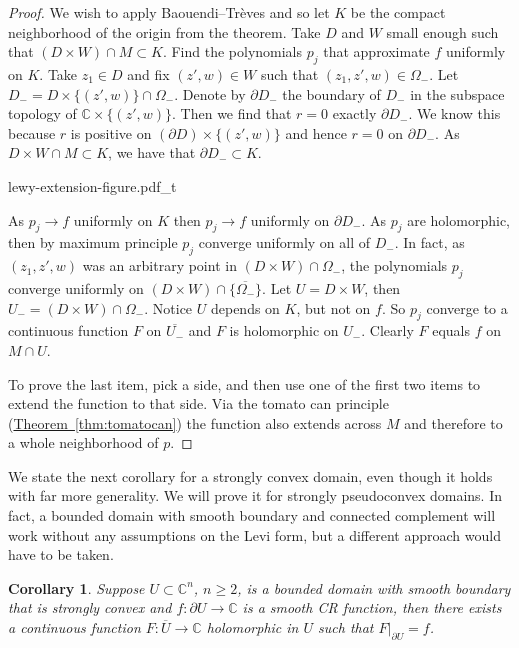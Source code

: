 \documentclass[12pt,openany]{book}
\newcommand{\C}{{\mathbb{C}}}
\theoremstyle{plain}
\newtheorem{cor}[thm]{Corollary}
\theoremstyle{remark}
\theoremstyle{definition}
\newenvironment{myfig}{%
    \begin{center}
}{%
    \end{center}
}
\theoremstyle{exercise}
\theoremstyle{example}
\newcommand{\thmref}[1]{\hyperref[#1]{Theorem~\ref*{#1}}}
\begin{document}
\begin{proof}
We wish to apply
Baouendi--Tr{\`e}ves and so let $K$ be the compact neighborhood of the
origin from the theorem.  Take $D$ and $W$ small enough such
that $(D \times W) \cap M \subset K$.
Find the polynomials $p_j$ that approximate $f$ uniformly on $K$.
Take $z_1 \in D$ and fix $(z',w) \in W$ such that
$(z_1,z',w) \in \Omega_-$.
Let
$D_- = D \times \{ (z',w) \} \cap \Omega_-$.
Denote by $\partial D_-$ the boundary of $D_-$ in the subspace topology
of $\C \times \{ (z',w) \}$.
Then we find that $r=0$ exactly $\partial D_-$.
We know this because $r$ is positive on $(\partial D) \times \{ (z',w) \}$
and hence $r=0$ on $\partial D_-$.
As $D \times W \cap M \subset K$, we have that $\partial D_- \subset K$.

\begin{myfig}
{lewy-extension-figure.pdf_t}
\end{myfig}

As $p_j \to f$ uniformly on $K$ then $p_j \to f$ uniformly on
$\partial D_-$.  As  $p_j$ are holomorphic, then by maximum
principle $p_j$ converge uniformly on all of $D_-$.  In fact, as $(z_1,z',w)$ was
an arbitrary point in $(D \times W) \cap \Omega_-$,
the polynomials $p_j$ converge uniformly on $(D \times W) \cap \{
\overline{\Omega_-} \}$.
%
Let $U = D \times W$, then $U_- = (D \times W) \cap \Omega_-$.  Notice 
$U$ depends on $K$, but not on $f$.
So $p_j$ converge to a continuous function $F$ on $\overline{U_-}$ and $F$
is holomorphic on
$U_-$.  Clearly $F$ equals $f$ on $M \cap U$.

To prove the last item, pick a side, and then use one of the first two
items to extend the function to that side.  Via the tomato can
principle (\thmref{thm:tomatocan}) the function also extends across $M$ and
therefore to a whole neighborhood of $p$.
\end{proof}

We state the next corollary for a strongly convex domain, even though it
holds with far more generality.  We will prove it for strongly pseudoconvex
domains.  In fact, a bounded domain with smooth
boundary and connected complement
will work without any assumptions on the Levi form, but 
a different approach would have to be taken.

\begin{cor}
Suppose $U \subset \C^n$, $n \geq 2$, is a bounded domain with smooth boundary that is
strongly convex 
and $f \colon \partial U \to \C$ is a smooth CR function, then
there exists a continuous function $F \colon \overline{U} \to \C$
holomorphic in $U$
such that $F|_{\partial U} = f$.
\end{cor}
\end{document}
